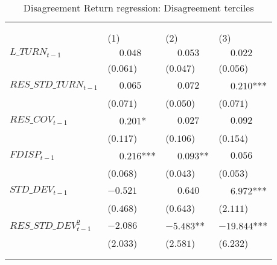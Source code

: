 \begin{table}

\caption[Disagreement Return Regression: Disagreement Terciles]{\label{tab:disagreement_return_reg_disagreement_terciles}Disagreement Return regression: Disagreement terciles}
\centering
\fontsize{9}{11}\selectfont
\begin{threeparttable}
\begin{tabular}[t]{>{\raggedright\arraybackslash}p{8cm}>{\raggedright\arraybackslash}p{1.9cm}>{\raggedright\arraybackslash}p{1.9cm}>{\raggedright\arraybackslash}p{1.9cm}}
\toprule
\multicolumn{1}{c}{ } & \multicolumn{3}{c}{$FF5\_ALPHA_t$} \\
\cmidrule(l{3pt}r{3pt}){2-4}
\multicolumn{1}{c}{ } & \multicolumn{1}{c}{$T_1$} & \multicolumn{1}{c}{$T_2$} & \multicolumn{1}{c}{$T_3$} \\
\cmidrule(l{3pt}r{3pt}){2-2} \cmidrule(l{3pt}r{3pt}){3-3} \cmidrule(l{3pt}r{3pt}){4-4}
 & \phantom{-}(1) & \phantom{-}(2) & \phantom{-}(3)\\
\midrule
$L\_TURN_{t-1}$ & $\phantom{-}0.048$ & $\phantom{-}0.053$ & $\phantom{-}0.022$\\
 & (\phantom{-}$0.061$) & (\phantom{-}$0.047$) & (\phantom{-}$0.056$)\\
\addlinespace
$RES\_STD\_TURN_{t-1}$ & $\phantom{-}0.065$ & $\phantom{-}0.072$ & $\phantom{-}0.210$***\\
 & (\phantom{-}$0.071$) & (\phantom{-}$0.050$) & (\phantom{-}$0.071$)\\
\addlinespace
$RES\_COV_{t-1}$ & $\phantom{-}0.201$* & $\phantom{-}0.027$ & $\phantom{-}0.092$\\
 & (\phantom{-}$0.117$) & (\phantom{-}$0.106$) & (\phantom{-}$0.154$)\\
\addlinespace
$FDISP_{t-1}$ & $\phantom{-}0.216$*** & $\phantom{-}0.093$** & $\phantom{-}0.056$\\
 & (\phantom{-}$0.068$) & (\phantom{-}$0.043$) & (\phantom{-}$0.053$)\\
\addlinespace
$STD\_DEV_{t-1}$ & $-0.521$ & $\phantom{-}0.640$ & $\phantom{-}6.972$***\\
 & (\phantom{-}$0.468$) & (\phantom{-}$0.643$) & (\phantom{-}$2.111$)\\
\addlinespace
$RES\_STD\_DEV^2_{t-1}$ & $-2.086$ & $-5.483$** & $-19.844$***\\
 & (\phantom{-}$2.033$) & (\phantom{-}$2.581$) & (\phantom{-}$6.232$)\\
 &  &  \vphantom{1} & \\
\midrule
 &  &  & \\

\end{tabular}
\end{threeparttable}
\end{table}
